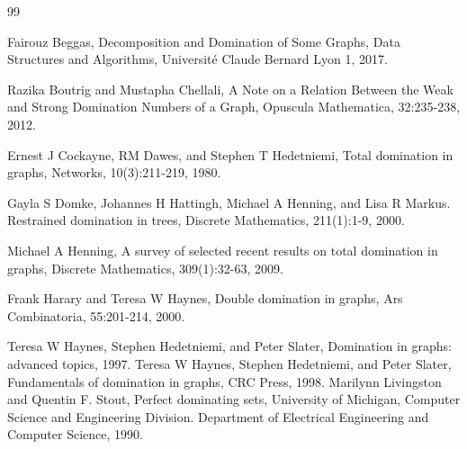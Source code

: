 \documentclass[twoside,12pt]{article}
\begin{document}
\begin{thebibliography}{99}

 Fairouz Beggas, Decomposition and Domination of Some Graphs, Data Structures and Algorithms, Université Claude Bernard Lyon 1, 2017.

 Razika Boutrig  and Mustapha Chellali, A Note on a Relation Between the Weak and Strong Domination Numbers of a Graph, Opuscula Mathematica, 32:235-238, 2012.

 Ernest J Cockayne, RM Dawes, and Stephen T Hedetniemi, Total domination in graphs, Networks, 10(3):211-219, 1980.

 Gayla S Domke, Johannes H Hattingh, Michael A Henning, and
Lisa R Markus. Restrained domination in trees, Discrete Mathematics,
211(1):1-9, 2000.

Michael A Henning, A survey of selected recent results on total domination in graphs, Discrete Mathematics, 309(1):32-63, 2009. 

 Frank Harary and Teresa W Haynes, Double domination in graphs, Ars Combinatoria, 55:201-214, 2000. 

 Teresa W Haynes, Stephen Hedetniemi, and Peter Slater, Domination in graphs: advanced topics, 1997. 
 Teresa W Haynes, Stephen Hedetniemi, and Peter Slater, Fundamentals of domination in graphs, CRC Press, 1998. 
 Marilynn Livingston and Quentin F. Stout, Perfect dominating sets, University of Michigan, Computer Science and Engineering Division. Department of Electrical Engineering and Computer Science, 1990.

 \end{thebibliography}
\end{document}
